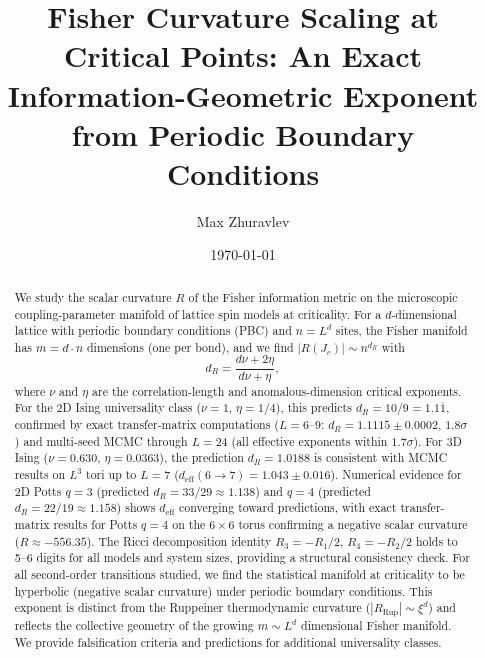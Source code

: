 \documentclass[aps,prl,twocolumn,superscriptaddress,showpacs]{revtex4-2}
\newcommand{\Scal}{R}
\newcommand{\Jc}{J_c}
\newcommand{\dR}{d_{\Scal}}
\begin{document}
\title{Fisher Curvature Scaling at Critical Points: An Exact Information-Geometric Exponent
  from Periodic Boundary Conditions}

\author{Max Zhuravlev}

\date{\today}

\begin{abstract}
We study the scalar curvature $\Scal$ of the Fisher information metric on the
microscopic coupling-parameter manifold of lattice spin models at criticality.
For a $d$-dimensional lattice with periodic boundary conditions (PBC) and
$n = L^d$ sites, the Fisher manifold has $m = d \cdot n$ dimensions (one per bond),
and we find $|\Scal(\Jc)| \sim n^{\dR}$ with
\begin{equation*}
  \dR = \frac{d\nu + 2\eta}{d\nu + \eta},
\end{equation*}
where $\nu$ and $\eta$ are the correlation-length and anomalous-dimension
critical exponents. For the 2D Ising universality class ($\nu = 1$, $\eta = 1/4$),
this predicts $\dR = 10/9 = 1.1\overline{1}$, confirmed by exact transfer-matrix
computations ($L = 6$--$9$: $\dR = 1.1115 \pm 0.0002$, $1.8\sigma$) and
multi-seed MCMC through $L = 24$ (all effective exponents within $1.7\sigma$).
For 3D Ising ($\nu = 0.630$, $\eta = 0.0363$), the prediction $\dR = 1.0188$
is consistent with MCMC results on $L^3$ tori up to $L = 7$
($d_\mathrm{eff}(6{\to}7) = 1.043 \pm 0.016$). Numerical evidence
for 2D Potts $q = 3$ (predicted $\dR = 33/29 \approx 1.138$) and $q = 4$
(predicted $\dR = 22/19 \approx 1.158$) shows $d_\mathrm{eff}$ converging toward predictions, with
exact transfer-matrix results for Potts $q = 4$ on the $6 \times 6$ torus
confirming a negative scalar curvature ($\Scal \approx -556.35$).
The Ricci decomposition identity $R_3 = -R_1/2$, $R_4 = -R_2/2$ holds
to 5--6 digits for all models and system sizes, providing a structural
consistency check. For all second-order transitions studied, we find the statistical manifold
at criticality to be hyperbolic (negative scalar curvature) under periodic
boundary conditions.
 This exponent is distinct from the Ruppeiner thermodynamic
curvature ($|\Scal_{\mathrm{Rup}}| \sim \xi^d$) and reflects the collective geometry
of the growing $m \sim L^d$ dimensional Fisher manifold. We provide falsification
criteria and predictions for additional universality classes.
\end{abstract}

\maketitle
\end{document}
